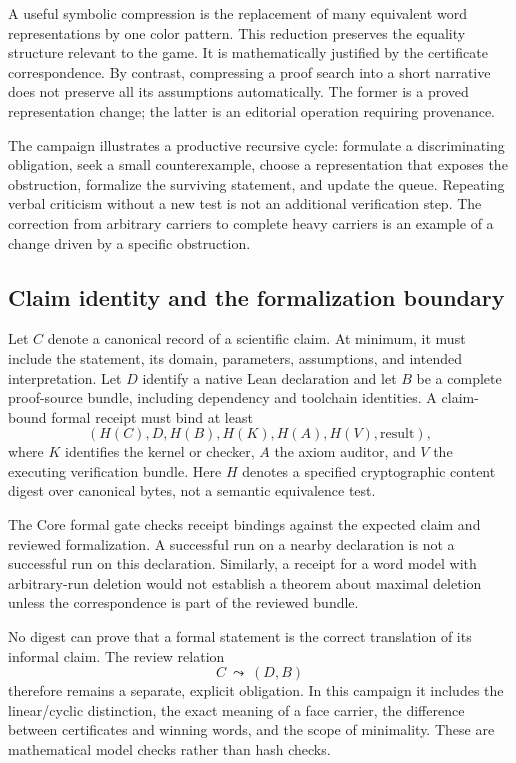 \documentclass[11pt,reqno]{amsart}
\theoremstyle{definition}
\begin{document}
A useful symbolic compression is the replacement of many equivalent word
representations by one color pattern. This reduction preserves the equality
structure relevant to the game. It is mathematically justified by the
certificate correspondence. By contrast, compressing a proof search into
a short narrative does not preserve all its assumptions automatically.
The former is a proved representation change; the latter is an editorial
operation requiring provenance.

The campaign illustrates a productive recursive cycle:
formulate a discriminating obligation, seek a small counterexample, choose a
representation that exposes the obstruction, formalize the surviving
statement, and update the queue. Repeating verbal criticism without a new
test is not an additional verification step. The correction from arbitrary
carriers to complete heavy carriers is an example of a change driven by a
specific obstruction.

\subsection{Claim identity and the formalization boundary}
Let $C$ denote a canonical record of a scientific claim. At minimum, it must
include the statement, its domain, parameters, assumptions, and intended
interpretation. Let $D$ identify a native Lean declaration and let $B$ be a
complete proof-source bundle, including dependency and toolchain identities.
A claim-bound formal receipt must bind at least
\begin{equation}\label{eq:receipt_tuple}
 (H(C),D,H(B),H(K),H(A),H(V),\text{result}),
\end{equation}
where $K$ identifies the kernel or checker, $A$ the axiom auditor, and $V$
the executing verification bundle. Here $H$ denotes a specified cryptographic
content digest over canonical bytes, not a semantic equivalence test.

The Core formal gate checks receipt bindings against the expected claim and
reviewed formalization. A successful run on a nearby declaration is not a
successful run on this declaration. Similarly, a receipt for a word model
with arbitrary-run deletion would not establish a theorem about maximal
deletion unless the correspondence is part of the reviewed bundle.

No digest can prove that a formal statement is the correct translation of
its informal claim. The review relation
\[
 C\ \mathrel{\leadsto}\ (D,B)
\]
therefore remains a separate, explicit obligation. In this campaign it
includes the linear/cyclic distinction, the exact meaning of a face carrier,
the difference between certificates and winning words, and the scope of
minimality. These are mathematical model checks rather than hash checks.
\end{document}
